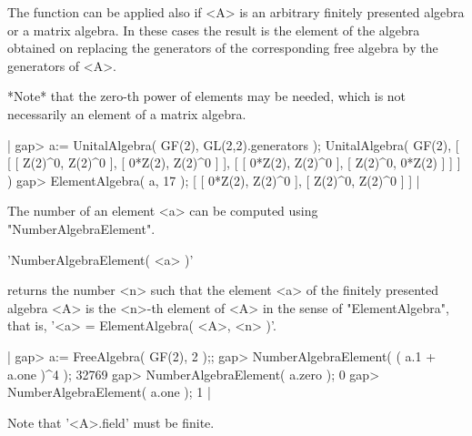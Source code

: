 The function can be applied also if <A> is an arbitrary finitely presented
algebra or a matrix algebra.  In these cases the result is the element of
the algebra obtained on replacing the generators of the corresponding free
algebra by the generators of <A>.

*Note* that the zero-th power of elements may be needed, which is not
necessarily an element of a matrix algebra.

|    gap> a:= UnitalAlgebra( GF(2), GL(2,2).generators );
    UnitalAlgebra( GF(2), [ [ [ Z(2)^0, Z(2)^0 ], [ 0*Z(2), Z(2)^0 ] ], 
      [ [ 0*Z(2), Z(2)^0 ], [ Z(2)^0, 0*Z(2) ] ] ] )
    gap> ElementAlgebra( a, 17 );
    [ [ 0*Z(2), Z(2)^0 ], [ Z(2)^0, Z(2)^0 ] ] |

The number of an element <a> can be computed using "NumberAlgebraElement".


'NumberAlgebraElement( <a> )'

returns the number <n> such that the element <a> of the finitely presented
algebra <A> is the <n>-th element of <A> in the sense of "ElementAlgebra",
that is, '<a> = ElementAlgebra( <A>, <n> )'.

|    gap> a:= FreeAlgebra( GF(2), 2 );;
    gap> NumberAlgebraElement( ( a.1 + a.one )^4 );
    32769
    gap> NumberAlgebraElement( a.zero );
    0
    gap> NumberAlgebraElement( a.one );
    1 |

Note that '<A>.field' must be finite.


